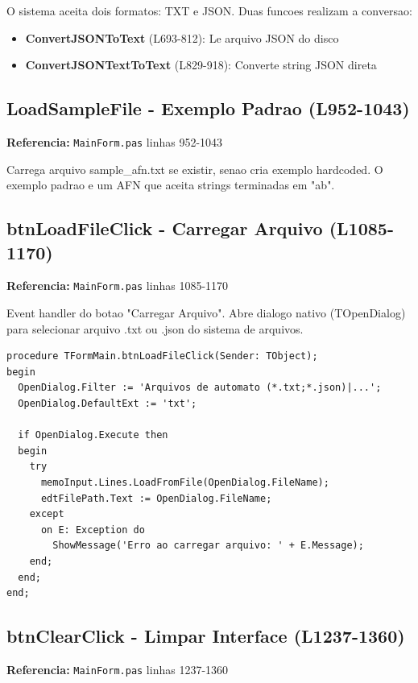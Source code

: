 \documentclass[12pt,a4paper]{article}
\begin{document}
O sistema aceita dois formatos: TXT e JSON. Duas funcoes realizam a conversao:

\begin{itemize}
    \item \textbf{ConvertJSONToText} (L693-812): Le arquivo JSON do disco
    \item \textbf{ConvertJSONTextToText} (L829-918): Converte string JSON direta
\end{itemize}

\subsection{LoadSampleFile - Exemplo Padrao (L952-1043)}

\textbf{Referencia:} \texttt{MainForm.pas} linhas 952-1043

Carrega arquivo sample\_afn.txt se existir, senao cria exemplo hardcoded. O exemplo padrao e um AFN que aceita strings terminadas em "ab".

\subsection{btnLoadFileClick - Carregar Arquivo (L1085-1170)}

\textbf{Referencia:} \texttt{MainForm.pas} linhas 1085-1170

Event handler do botao "Carregar Arquivo". Abre dialogo nativo (TOpenDialog) para selecionar arquivo .txt ou .json do sistema de arquivos.

\begin{lstlisting}[style=pascal, caption={btnLoadFileClick}]
procedure TFormMain.btnLoadFileClick(Sender: TObject);
begin
  OpenDialog.Filter := 'Arquivos de automato (*.txt;*.json)|...';
  OpenDialog.DefaultExt := 'txt';
  
  if OpenDialog.Execute then
  begin
    try
      memoInput.Lines.LoadFromFile(OpenDialog.FileName);
      edtFilePath.Text := OpenDialog.FileName;
    except
      on E: Exception do
        ShowMessage('Erro ao carregar arquivo: ' + E.Message);
    end;
  end;
end;
\end{lstlisting}

\subsection{btnClearClick - Limpar Interface (L1237-1360)}

\textbf{Referencia:} \texttt{MainForm.pas} linhas 1237-1360
\end{document}
